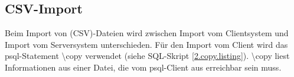 \subsection{CSV-Import}
Beim Import von (CSV)-Dateien wird zwischen Import vom Clientsystem und  Import vom Serversystem unterschieden.
Für den Import vom Client wird das psql-Statement \textbackslash copy verwendet (siehe SQL-Skript \ref{2.copy.listing}).
\textbackslash copy liest Informationen aus einer Datei,
die vom psql-Client aus erreichbar sein muss. \cite{postgres2018Copy}